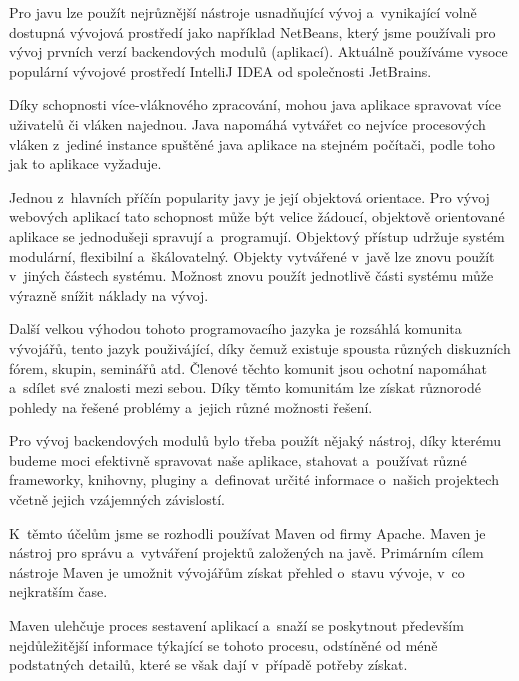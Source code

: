 \documentclass[12pt]{article}
\begin{document}
{%
Pro javu lze použít nejrůznější nástroje usnadňující vývoj a~vynikající volně dostupná vývojová prostředí
jako například NetBeans, který jsme používali pro vývoj prvních verzí backendových modulů
(aplikací).
Aktuálně používáme vysoce populární vývojové prostředí IntelliJ IDEA
od společnosti JetBrains.

Díky schopnosti více-vláknového zpracování,
mohou java aplikace spravovat více uživatelů či vláken najednou.
Java napomáhá vytvářet co nejvíce procesových vláken z~jediné instance
spuštěné java aplikace na stejném počítači, podle toho jak to aplikace vyžaduje.


Jednou z~hlavních příčín popularity javy je její objektová orientace.
Pro vývoj webových aplikací tato schopnost může být velice žádoucí,
objektově orientované aplikace se jednodušeji spravují a~programují.
Objektový přístup udržuje systém modulární, flexibilní a~škálovatelný.
Objekty vytvářené v~javě lze znovu použít v~jiných částech systému.
Možnost znovu použít jednotlivě části systému může výrazně snížit náklady na vývoj.

Další velkou výhodou tohoto programovacího jazyka je rozsáhlá komunita vývojářů,
tento jazyk použivájící, díky čemuž existuje spousta různých diskuzních fórem,
skupin, seminářů atd. Členové těchto komunit
jsou ochotní napomáhat a~sdílet své znalosti mezi sebou.
Díky těmto komunitám lze získat různorodé pohledy na řešené problémy
a~jejich různé možnosti řešení.

\cite{xicom}


Pro vývoj backendových modulů bylo třeba použít nějaký nástroj,
díky kterému budeme moci efektivně spravovat naše aplikace,
stahovat a~používat různé frameworky, knihovny, pluginy 
a~definovat určité informace o~našich projektech včetně jejich vzájemných závislostí. 

K~těmto účelům jsme se rozhodli používat Maven od firmy Apache.
Maven je nástroj pro správu a~vytváření projektů založených na javě.
Primárním cílem nástroje Maven je umožnit vývojářům získat přehled o~stavu 
vývoje, v~co nejkratším čase. 

Maven ulehčuje proces sestavení aplikací a~snaží se poskytnout především 
nejdůležitější informace týkající se tohoto procesu,
odstíněné od méně podstatných detailů,
které se však dají v~případě potřeby získat. 

}
\end{document}
